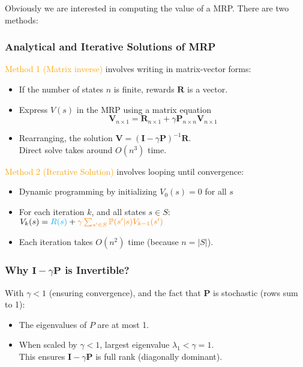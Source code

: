 \documentclass{article}
\begin{document}
Obviously we are interested in computing the value of a MRP. There are two methods:
\begin{thmbox}
    \subsubsection*{Analytical and Iterative Solutions of MRP}
    \textcolor{orange}{Method 1 (Matrix inverse)} involves writing in matrix-vector forms:
    \begin{itemize}
    \item If the number of states $n$ is finite, rewards $\mathbf{R}$ is a vector.
    \item Express $V(s)$ in the MRP using a matrix equation
        \begin{equation*}
          \mathbf{V}_{n \times 1} = \mathbf{R}_{n \times 1} + \gamma \mathbf{P}_{n \times n} \mathbf{V}_{n \times 1}
        \end{equation*}
    \item Rearranging, the solution $\mathbf{V} = (\mathbf{I} - \gamma \mathbf{P})^{-1} \mathbf{R}$.
        \\Direct solve takes around $O(n^3)$ time.
    \end{itemize}

    \vspace{2em}
    \textcolor{orange}{Method 2 (Iterative Solution)} involves looping until convergence:
    \begin{itemize}
    \item Dynamic programming by initializing $V_0(s) = 0$ for all $s$
    \item For each iteration $k$, and all states $s \in S$: \hspace{4em} $V_{k}(s) = \textcolor{cyan}{R(s)} + \textcolor{orange}{\gamma \sum_{s' \in S} \mathbb{P}(s' | s) V_{k-1}(s')}$
    \item Each iteration takes $O(n^2)$ time (because $n = |S|$).
    \end{itemize}
  \end{thmbox}

\begin{hintbox}
    \subsubsection*{Why $\mathbf{I} - \gamma \mathbf{P}$ is Invertible?}
    \begin{prfbox}
        With $\gamma < 1$ (ensuring convergence), and the fact that $\mathbf{P}$ is stochastic (rows sum to 1):
        \begin{itemize}
        \item The eigenvalues of $P$ are at most 1.
        \item When scaled by $\gamma < 1$, largest eigenvalue $\lambda_1 < \gamma = 1$. 
        \\This ensures $\mathbf{I} - \gamma \mathbf{P}$ is full rank (diagonally dominant).
        \end{itemize}
    \end{prfbox}
\end{hintbox}
\end{document}
